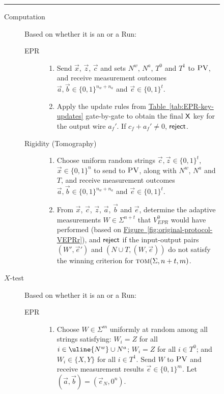 \documentclass[11pt]{article}
\numberwithin{equation}{section}
\theoremstyle{definition}
\theoremstyle{plain}
\newcommand{\expref}[2]{\hyperref[#2]{#1~\ref{#2}}}
\newcommand{\tom}{\textsc{tom}}
\newcommand{\pv}{\textsc{PV}}
\newcommand{\highlight}[1]{\uline{#1}}
\begin{document}
\begin{figure}[H]
\rule[1ex]{\textwidth}{0.5pt}
\vspace{-20pt}
\begin{description}
\item[Computation] Based on whether it is
an  or a  Run:
	\begin{description}
	\item[EPR]
		\begin{enumerate}
		\item[(i)] Send $\vec{x}$, $\vec{z}$, $\vec{c}$ and sets \highlight{$N^w$}, $N^a$, $T^0$
      and $T^1$ to $\pv$, and receive measurement outcomes \highlight{$\vec{a},\vec{b}\in
        \{0,1\}^{n_w + n_a}$} and $\vec{e}\in\{0,1\}^t$.
		\item[(ii)] Apply the update rules from \expref{Table}{tab:EPR-key-updates} gate-by-gate to obtain the final $\sf X$ key for the output wire $a_f'$. If $c_f+a_f'\neq 0$, $\sf reject$. 
		\end{enumerate}
	\item[Rigidity (Tomography)]
		\begin{enumerate}
		\item[(i)] Choose uniform random strings $\vec{c},\vec{z}\in\{0,1\}^t$, $\vec{x} \in \{0,1\}^n$ 
      to send to $\pv$, along with \highlight{$N^w$}, $N^a$ and $T$, and receive measurement outcomes \highlight{$\vec{a}, \vec{b}\in \{0,1\}^{n_w + n_a}$} and $\vec{e}\in\{0,1\}^t$. 
		\item[(ii)]
		From $\vec{x}$, $\vec{c}$, $\vec{z}$, $\vec{a}$, $\vec{b}$ and $\vec{e}$, determine the adaptive measurements $W\in\Sigma^{n+t}$ that $V_{EPR}^0$ would have performed (based on \expref{Figure}{fig:original-protocol-VEPRr}), and $\sf reject$ if the input-output pairs $(W',\vec{e}')$ and $(N\cup T,(W,\vec{e}))$ do not satisfy the winning criterion for $\tom(\Sigma,n+t,m)$.
		\end{enumerate}
	\end{description}
\item[$X$-test] Based on whether it is
an  or a  Run:
\begin{description}
	\item[EPR] 
	\begin{enumerate}
		\item[(i)] Choose $W\in\Sigma^m$ uniformly at random among all strings
      satisfying: $W_i=Z$ for all $i\in \highlight{N^w} \cup N^a$; $W_i=Z$ for all $i\in T^0$; and $W_i\in\{X,Y\}$ for all $i\in T^1$. Send $W$ to $\pv$ and receive measurement results $\vec{e}\in\{0,1\}^m$. Let $(\vec{a},\vec{b})=(\vec{e}_N,0^n)$. 

\end{enumerate}
\end{description}
\end{description}
\end{figure}
\end{document}
